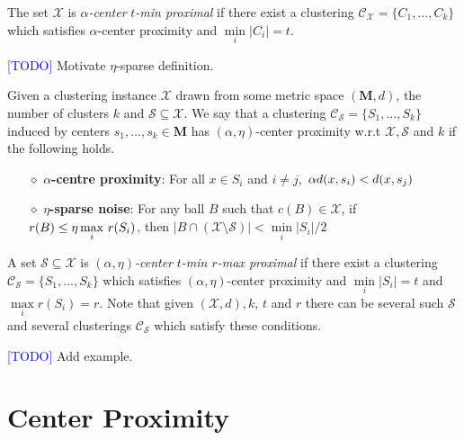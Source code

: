 \documentclass[anon,12pt]{colt2016} %
\newcommand{\mc}{\mathcal}
\newcommand{\mb}{\mathbf}
\newcommand{\todo}{\textcolor{blue}{[TODO]}\xspace}
\begin{document}
\noindent The set $\mc X$ is {\it $\alpha$-center} {\it $t$-min proximal} if there exist a clustering $\mc C_{\mc X}=\{C_1,\ldots,C_k\}$ which satisfies $\alpha$-center proximity and $\min\limits_{i} \lvert C_i\rvert = t$. 

\todo Motivate $\eta$-sparse definition.

\begin{definition}
Given a clustering instance $\mc X$ drawn from some metric space $(\mb M, d)$, the number of clusters $k$ and $\mc S \subseteq \mc X$. We say that a clustering $\mc C_{\mc S} = \{S_1, \ldots, S_k\}$ induced by centers $s_1, \ldots, s_k \in \mb M$ has $(\alpha, \eta)$-center proximity w.r.t $\mc X, \mc S$ and $k$ if the following holds.

\begin{itemize}[nolistsep, noitemsep]
\label{defn:alphacpnoise}	

\item[$\diamond$] {\bf $\alpha$-centre proximity}: For all $x \in S_i$ and $i\neq j$, $\thinspace\alpha d(x, s_i) < d(x, s_j)$
\item[$\diamond$]{\bf $\eta$-sparse noise}: For any ball $B$ such that $c(B)\in \mathcal{X}$, if $r(B)\leq \eta\max\limits_{i} \thinspace r(S_i)$, then $|B\cap (\mc X\setminus \mc S)| < \min\limits_{i} |S_i|/2$
\end{itemize}
\end{definition}

\noindent A set $\mc S \subseteq \mc X$ is {\it $(\alpha, \eta)$-center} {\it $t$-min $r$-max proximal} if there exist a clustering $\mc C_{\mc S}=\{S_1,\ldots,S_k\}$ which satisfies $(\alpha, \eta)$-center proximity and $\min\limits_{i} \lvert S_i\rvert = t$ and $\max\limits_{i} r(S_i) = r$. Note that given $(\mc X, d), k$, $t$ and $r$ there can be several such $\mc S$ and several clusterings $\mc C_{\mc S}$ which satisfy these conditions.

\todo Add example.


\section{Center Proximity}

\end{document}
